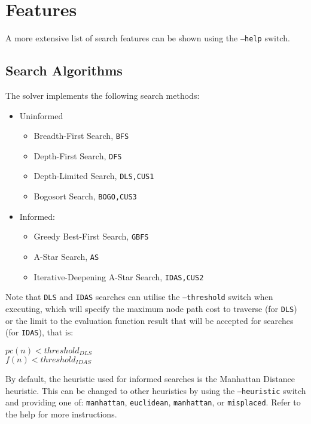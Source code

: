 \section{Features}

A more extensive list of search features can be shown using the \texttt{--help}
switch.

\subsection{Search Algorithms}
\label{sub:Search Algorithms}

The solver implements the following search methods:

\begin{itemize}
  \item Uninformed
  \begin{itemize}
    \item Breadth-First Search, \texttt{BFS}
    \item Depth-First Search, \texttt{DFS}
    \item Depth-Limited Search, \texttt{DLS,CUS1}
    \item Bogosort Search, \texttt{BOGO,CUS3}
  \end{itemize}
  \item Informed:
  \begin{itemize}
    \item Greedy Best-First Search, \texttt{GBFS}
    \item A-Star Search, \texttt{AS}
    \item Iterative-Deepening A-Star Search, \texttt{IDAS,CUS2}
  \end{itemize}
\end{itemize}

Note that \texttt{DLS} and \texttt{IDAS} searches can utilise the
\texttt{--threshold} switch when executing, which will specify the
maximum node path cost to traverse (for \texttt{DLS}) or the limit
to the evaluation function result that will be accepted for searches
(for \texttt{IDAS}), that is:

\begin{center}
  \vspace{1em}
  \noindent
  $pc(n) < threshold_{DLS}$
  \\
  $f(n) < threshold_{IDAS}$
  \vspace{1em}
\end{center}

By default, the heuristic used for informed searches is the Manhattan Distance
heuristic. This can be changed to other heuristics by using the \texttt{--heuristic}
switch and providing one of: \texttt{manhattan}, \texttt{euclidean},
\texttt{manhattan}, or \texttt{misplaced}. Refer to the help for more instructions.


